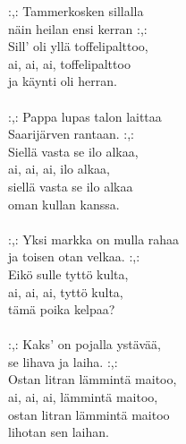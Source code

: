 
:,: Tammerkosken sillalla \\ näin heilan ensi kerran :,: \\ Sill' oli yllä toffelipalttoo, \\ ai, ai, ai, toffelipalttoo \\ ja käynti oli herran. \\ \hspace{10mm} \\ :,: Pappa lupas talon laittaa \\ Saarijärven rantaan. :,: \\ Siellä vasta se ilo alkaa, \\ ai, ai, ai, ilo alkaa, \\ siellä vasta se ilo alkaa \\ oman kullan kanssa. \\ \hspace{10mm} \\ :,: Yksi markka on mulla rahaa \\ ja toisen otan velkaa. :,: \\ Eikö sulle tyttö kulta, \\ ai, ai, ai, tyttö kulta, \\ tämä poika kelpaa? \\ \hspace{10mm} \\ :,: Kaks' on pojalla ystävää, \\ se lihava ja laiha. :,: \\ Ostan litran lämmintä maitoo, \\ ai, ai, ai, lämmintä maitoo, \\ ostan litran lämmintä maitoo \\ lihotan sen laihan.